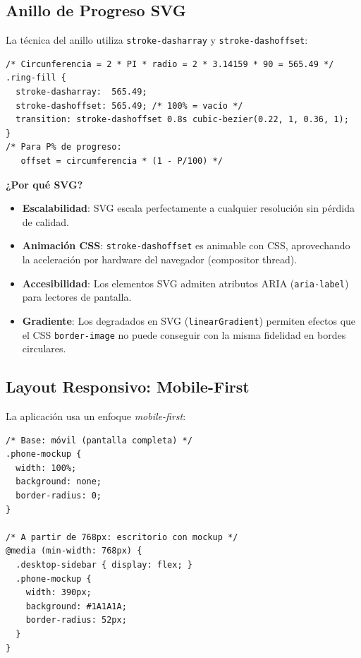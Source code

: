 \documentclass[12pt, a4paper]{article}
\begin{document}
\subsection{Anillo de Progreso SVG}

La técnica del anillo utiliza \texttt{stroke-dasharray} y \texttt{stroke-dashoffset}:

\begin{lstlisting}[style=css, caption={Técnica SVG para el anillo de progreso}]
/* Circunferencia = 2 * PI * radio = 2 * 3.14159 * 90 = 565.49 */
.ring-fill {
  stroke-dasharray:  565.49;
  stroke-dashoffset: 565.49; /* 100% = vacío */
  transition: stroke-dashoffset 0.8s cubic-bezier(0.22, 1, 0.36, 1);
}
/* Para P% de progreso:
   offset = circumferencia * (1 - P/100) */
\end{lstlisting}

\begin{justificacionbox}
\textbf{¿Por qué SVG?}
\begin{itemize}
  \item \textbf{Escalabilidad}: SVG escala perfectamente a cualquier resolución sin pérdida de calidad.
  \item \textbf{Animación CSS}: \texttt{stroke-dashoffset} es animable con CSS, aprovechando la aceleración por hardware del navegador (compositor thread).
  \item \textbf{Accesibilidad}: Los elementos SVG admiten atributos ARIA (\texttt{aria-label}) para lectores de pantalla.
  \item \textbf{Gradiente}: Los degradados en SVG (\texttt{linearGradient}) permiten efectos que el CSS \texttt{border-image} no puede conseguir con la misma fidelidad en bordes circulares.
\end{itemize}
\end{justificacionbox}

\subsection{Layout Responsivo: Mobile-First}

La aplicación usa un enfoque \textit{mobile-first}:

\begin{lstlisting}[style=css, caption={Estructura responsiva de Nativo}]
/* Base: móvil (pantalla completa) */
.phone-mockup {
  width: 100%;
  background: none;
  border-radius: 0;
}

/* A partir de 768px: escritorio con mockup */
@media (min-width: 768px) {
  .desktop-sidebar { display: flex; }
  .phone-mockup {
    width: 390px;
    background: #1A1A1A;
    border-radius: 52px;
  }
}
\end{lstlisting}
\end{document}
